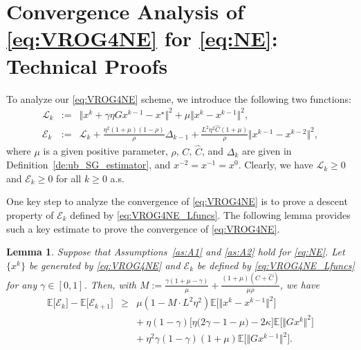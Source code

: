 \documentclass{article}
\newcommand{\sets}[1]{\{#1\}}
\newcommand{\norms}[1]{\Vert#1\Vert}
\newcommand{\Expk}[1]{\mathbb{E}\big[#1\big]}
\newcommand{\Lc}{\mathcal{L}}
\newcommand{\Ec}{\mathcal{E}}
\theoremstyle{plain}
\newtheorem{lemma}[theorem]{Lemma}
\theoremstyle{definition}
\theoremstyle{remark}
\begin{document}
\section{Convergence Analysis of \ref{eq:VROG4NE} for \eqref{eq:NE}: Technical Proofs}\label{apdx:sec:VROG4NE}
To analyze our \eqref{eq:VROG4NE} scheme, we introduce the following two functions:
\begin{equation}\label{eq:VROG4NE_Lfuncs}
\begin{array}{lcl}
\Lc_k & := &  \norms{x^k + \gamma\eta Gx^{k-1} - x^{\star}}^2 + \mu \norms{x^k - x^{k-1}}^2, \\
\Ec_k &:= & \Lc_k + \frac{\eta^2(1+\mu)(1-\rho)}{\rho} \Delta_{k-1} +   \frac{L^2\eta^2\hat{C}(1+\mu)}{ \rho } \norms{x^{k-1} - x^{k-2}}^2,
\end{array}
\end{equation}
where $\mu$ is a given positive parameter, $\rho$, $C$, $\hat{C}$, and $\Delta_k$ are given in Definition~\ref{de:ub_SG_estimator},  and $x^{-2} = x^{-1} = x^0$.
Clearly, we have $\Lc_k \geq 0$ and $\Ec_k \geq 0$ for all $k \geq 0$ a.s.

One key step to analyze the convergence of \eqref{eq:VROG4NE} is to prove a descent property of $\Ec_k$ defined by \eqref{eq:VROG4NE_Lfuncs}.
The following lemma provides such a key estimate to prove the convergence of \eqref{eq:VROG4NE}.

\begin{lemma}\label{le:VROG4NE_key_estimate1}
Suppose that Assumptions~\ref{as:A1} and \ref{as:A2} hold for \eqref{eq:NE}.
Let $\sets{x^k}$ be generated by \eqref{eq:VROG4NE} and $\Ec_k$ be defined by \eqref{eq:VROG4NE_Lfuncs} for any $\gamma \in [0, 1]$.
Then, with $M := \frac{\gamma(1 + \mu - \gamma)}{\mu} + \frac{ (1+\mu)(C + \hat{C})}{\mu \rho }$, we have
\begin{equation}\label{eq:VROG4NE_key_estimate1}
\begin{array}{lcl}
\Expk{ \Ec_k } - \Expk{ \Ec_{k+1} } & \geq &  \mu \left(  1 -  M \cdot L^2\eta^2  \right) \Expk{ \norms{x^k - x^{k-1}}^2 }  \\
&& + {~}  \eta (1-\gamma) \big[ \eta \big( 2\gamma - 1 - \mu \big) - 2\kappa \big]  \Expk{ \norms{Gx^k}^2 } \\
&& + {~} \eta^2 \gamma(1-\gamma)(1+\mu) \Expk{ \norms{Gx^{k-1}}^2 }.
\end{array}
\end{equation}
\end{lemma}
\end{document}
